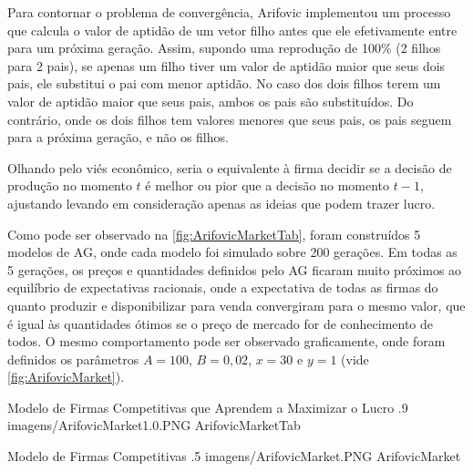 Para contornar o problema de convergência, Arifovic implementou um processo que calcula o valor de aptidão de um vetor filho antes que ele efetivamente entre para um próxima geração. Assim, supondo uma reprodução de 100\% (2 filhos para 2 pais), se apenas um filho tiver um valor de aptidão maior que seus dois pais, ele substitui o pai com menor aptidão. No caso dos dois filhos terem um valor de aptidão maior que seus pais, ambos os pais são substituídos. Do contrário, onde os dois filhos tem valores menores que seus pais, os pais seguem para a próxima geração, e não os filhos.

Olhando pelo viés econômico, seria o equivalente à firma decidir se a decisão de produção no momento $t$ é melhor ou pior que a decisão no momento $t-1$, ajustando levando em consideração apenas as ideias que podem trazer lucro. 

Como pode ser observado na \autoref{fig:ArifovicMarketTab}, foram construídos 5 modelos de AG, onde cada modelo foi simulado sobre 200 gerações. Em todas as 5 gerações, os preços e quantidades definidos pelo AG ficaram muito próximos ao equilíbrio de expectativas racionais, onde a expectativa de todas as firmas do quanto produzir e disponibilizar para venda convergiram para o mesmo valor, que é igual às quantidades ótimos se o preço de mercado for de conhecimento de todos. O mesmo comportamento pode ser observado graficamente, onde foram definidos os parâmetros $A = 100$, $B = 0,02$, $x = 30$ e $y = 1$ (vide \autoref{fig:ArifovicMarket}).

\figura
	{Modelo de Firmas Competitivas que Aprendem a Maximizar o Lucro}
	{.9}
	{imagens/ArifovicMarket1.0.PNG}
	{ArifovicMarketTab}
	{}

\figura
	{Modelo de Firmas Competitivas}
	{.5}
	{imagens/ArifovicMarket.PNG}
	{ArifovicMarket}
	{}
